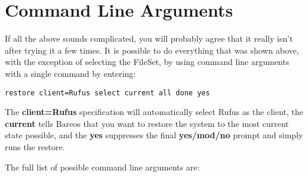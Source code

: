 \section{Command Line Arguments}
\label{CommandArguments}

If all the above sounds complicated, you will probably agree that it really
isn't after trying it a few times. It is possible to do everything that was
shown above, with the exception of selecting the FileSet, by using command
line arguments with a single command by entering:

\footnotesize
\begin{verbatim}
restore client=Rufus select current all done yes
\end{verbatim}
\normalsize

The {\bf client=Rufus} specification will automatically select Rufus as the
client, the {\bf current} tells Bareos that you want to restore the system to
the most current state possible, and the {\bf yes} suppresses the final {\bf
yes/mod/no} prompt and simply runs the restore.

The full list of possible command line arguments are:

